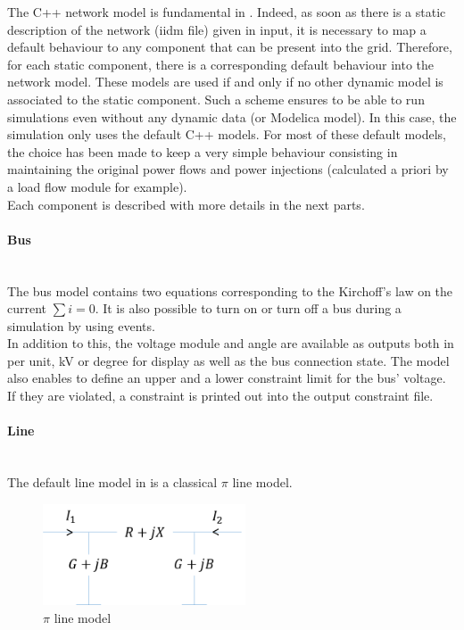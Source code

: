 \documentclass[a4paper, 12pt]{report}
\begin{document}
The C++ network model is fundamental in \Dynawo. Indeed, as soon as there is a static description of the network (iidm file) given in input, it is necessary to map a default behaviour to any component that can be present into the grid. Therefore, for each static component, there is a corresponding default behaviour into the network model. These models are used if and only if no other dynamic model is associated to the static component. Such a scheme ensures to be able to run simulations even without any dynamic data (or Modelica model). In this case, the simulation only uses the default C++ models. For most of these default models, the choice has been made to keep a very simple behaviour consisting in maintaining the original power flows and power injections (calculated a priori by a load flow module for example). \\
Each component is described with more details in the next parts. \\

\paragraph{Bus}
~~\\

The bus model contains two equations corresponding to the Kirchoff's law on the current $\sum i = 0$. It is also possible to turn on or turn off a bus during a simulation by using events. \\
In addition to this, the voltage module and angle are available as outputs both in per unit, kV or degree for display as well as the bus connection state. The model also enables to define an upper and a lower constraint limit for the bus' voltage. If they are violated, a constraint is printed out into the output constraint file. \\

\paragraph{Line}
~~\\

The default line model in \Dynawo is a classical $\pi$ line model.

\begin{figure}[h!]
\centering
\includegraphics[width=60mm]{../resources/PiLine.png}
\caption{$\pi$ line model}
\end{figure}
\end{document}
